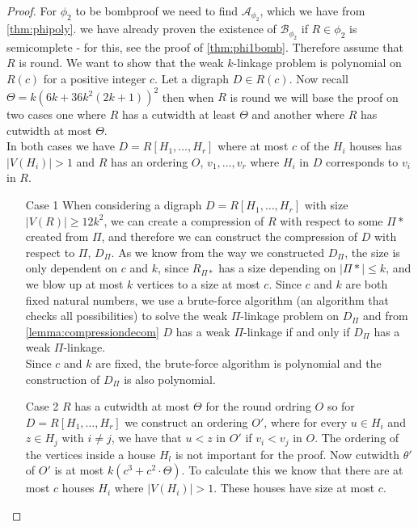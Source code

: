 \begin{proof}
    For $\phi_2$ to be bombproof we need to find $\mathcal{A}_{\phi_2}$, which we have from \autoref{thm:phipoly}.
    we have already proven the existence of $\mathcal{B}_{\phi_2}$ if $R\in\phi_2$ is semicomplete - for this, see the proof of \autoref{thm:phi1bomb}.
    Therefore assume that $R$ is round. 
    We want to show that the weak $k$-linkage problem is polynomial on $R(c)$ for a positive integer $c$.
    Let a digraph $D\in R(c)$. 
    Now recall $\Theta = k(6k+36k^2(2k+1))^2$ then when $R$ is round we will base the proof on two cases one where $R$ has a cutwidth at least $\Theta$ and another where $R$ has cutwidth at most $\Theta$.\\
    In both cases we have $D=R[H_1,\dots ,H_r]$ where at most $c$ of the $H_i$ houses has $|V(H_i)|>1$ and $R$ has an ordering $O$, $v_1,\dots ,v_r$ where $H_i$ in $D$ corresponds to $v_i$ in $R$.
    \begin{itemize}
        \item[Case 1] When considering a digraph $D=R[H_1,\dots ,H_r]$ with size $|V(R)|\geq 12k^2$, we can create a compression of $R$ with respect to some $\Pi*$ created from $\Pi$, and therefore we can construct the compression of $D$ with respect to $\Pi$, $D_{\Pi}$.
        As we know from the way we constructed $D_\Pi$, the size is only dependent on $c$ and $k$, since $R_{\Pi*}$ has a size depending on $|\Pi*|\leq k$, and we blow up at most $k$ vertices to a size at most $c$. 
        Since $c$ and $k$ are both fixed natural numbers, we use a brute-force algorithm (an algorithm that checks all possibilities) to solve the weak $\Pi$-linkage problem on $D_\Pi$ and from \autoref{lemma:compressiondecom} $D$ has a weak $\Pi$-linkage if and only if $D_\Pi$ has a weak $\Pi$-linkage.\\
        Since $c$ and $k$ are fixed, the brute-force algorithm is polynomial and the construction of $D_\Pi$ is also polynomial.
        \item[Case 2] $R$ has a cutwidth at most $\Theta$ for the round ordring $O$ so for $D=R[H_1,\dots ,H_r]$ we construct an ordering $O'$, where for every $u\in H_i$ and $z\in H_j$ with $i\neq j$, we have that $u < z$ in $O'$ if $v_i < v_j$ in $O$.
        The ordering of the vertices inside a house $H_l$ is not important for the proof.
        Now cutwidth $\theta'$ of $O'$ is at most $k(c^3+c^2\cdot \Theta)$.
        To calculate this we know that there are at most $c$ houses $H_i$ where $|V(H_i)|>1$. 
        These houses have size at most $c$. 

\end{itemize}
\end{proof}
